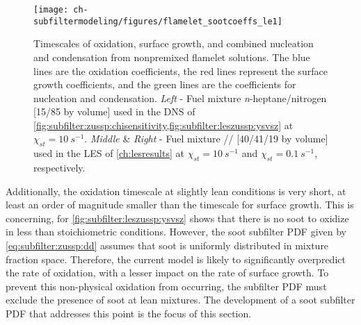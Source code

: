 \begin{figure}[htb]
  \centering
  \texttt{[image: ch-subfiltermodeling/figures/flamelet\_sootcoeffs\_le1]}
  \caption[Soot Growth and Oxidation Timescales, 1/\texorpdfstring{$\tau$}{t} vs. \texorpdfstring{$Z$}{Z}]{Timescales of oxidation, surface growth, and combined nucleation and condensation from nonpremixed flamelet solutions. The blue lines are the oxidation coefficients, the red lines represent the surface growth coefficients, and the green lines are the coefficients for nucleation and condensation. \textit{Left} - Fuel mixture \textit{n}-heptane/nitrogen [15/85 by volume] used in the DNS of \cref{fig:subfilter:zussp:chisensitivity,fig:subfilter:leszussp:ysvsz} at $\chi_{st} = 10\ s^{-1}$. \textit{Middle} \& \textit{Right} - Fuel mixture // [40/41/19 by volume] used in the LES of \cref{ch:lesresults} at $\chi_{st} = 10\ s^{-1}$ and $\chi_{st} = 0.1\ s^{-1}$, respectively.}
  \label{fig:subfilter:leszussp:kvsz}
\end{figure}

Additionally, the oxidation timescale at slightly lean conditions is very short, at least an order of magnitude smaller than the timescale for surface growth. This is concerning, for \cref{fig:subfilter:leszussp:ysvsz} shows that there is no soot to oxidize in less than stoichiometric conditions. However, the soot subfilter PDF given by \cref{eq:subfilter:zussp:dd} assumes that soot is uniformly distributed in mixture fraction space. Therefore, the current model is likely to significantly overpredict the rate of oxidation, with a lesser impact on the rate of surface growth. To prevent this non-physical oxidation from occurring, the subfilter PDF must exclude the presence of soot at lean mixtures. The development of a soot subfilter PDF that addresses this point is the focus of this section.


